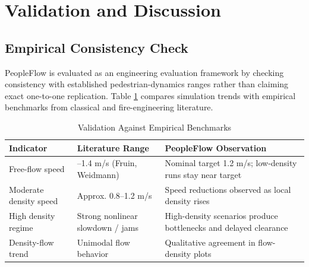 \documentclass[journal]{IEEEtran}
\begin{document}
\section{Validation and Discussion}
\subsection{Empirical Consistency Check}
PeopleFlow is evaluated as an engineering evaluation framework by checking consistency with established pedestrian-dynamics ranges rather than claiming exact one-to-one replication. Table \ref{tab:validation} compares simulation trends with empirical benchmarks from classical and fire-engineering literature.

\begin{table}[!t]
\centering
\caption{Validation Against Empirical Benchmarks}
\label{tab:validation}
{\footnotesize
\setlength{\tabcolsep}{3pt}
\renewcommand{\arraystretch}{1.12}
\begin{tabularx}{\columnwidth}{>{\raggedright\arraybackslash}p{1.60cm}>{\raggedright\arraybackslash}p{1.95cm}>{\raggedright\arraybackslash}X}
\toprule
\textbf{Indicator} & \textbf{Literature Range} & \textbf{PeopleFlow Observation} \\
\midrule
Free-flow speed & 1.2--1.4 m/s (Fruin, Weidmann) & Nominal target 1.2 m/s; low-density runs stay near target \\
Moderate density speed & Approx. 0.8--1.2 m/s & Speed reductions observed as local density rises \\
High density regime & Strong nonlinear slowdown / jams & High-density scenarios produce bottlenecks and delayed clearance \\
Density-flow trend & Unimodal flow behavior & Qualitative agreement in flow-density plots \\
\bottomrule
\end{tabularx}
}
\end{table}
\end{document}
